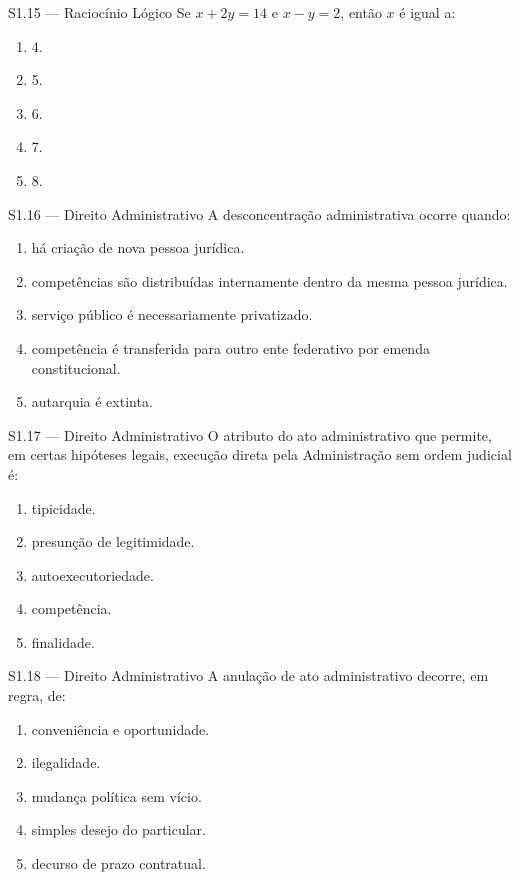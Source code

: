 \begin{questao}{S1.15 — Raciocínio Lógico}
Se $x+2y=14$ e $x-y=2$, então $x$ é igual a:
\begin{enumerate}[label=\Alph*)]
\item 4.
\item 5.
\item 6.
\item 7.
\item 8.
\end{enumerate}
\end{questao}

\begin{questao}{S1.16 — Direito Administrativo}
A desconcentração administrativa ocorre quando:
\begin{enumerate}[label=\Alph*)]
\item há criação de nova pessoa jurídica.
\item competências são distribuídas internamente dentro da mesma pessoa jurídica.
\item serviço público é necessariamente privatizado.
\item competência é transferida para outro ente federativo por emenda constitucional.
\item autarquia é extinta.
\end{enumerate}
\end{questao}

\begin{questao}{S1.17 — Direito Administrativo}
O atributo do ato administrativo que permite, em certas hipóteses legais, execução direta pela Administração sem ordem judicial é:
\begin{enumerate}[label=\Alph*)]
\item tipicidade.
\item presunção de legitimidade.
\item autoexecutoriedade.
\item competência.
\item finalidade.
\end{enumerate}
\end{questao}

\begin{questao}{S1.18 — Direito Administrativo}
A anulação de ato administrativo decorre, em regra, de:
\begin{enumerate}[label=\Alph*)]
\item conveniência e oportunidade.
\item ilegalidade.
\item mudança política sem vício.
\item simples desejo do particular.
\item decurso de prazo contratual.
\end{enumerate}
\end{questao}

